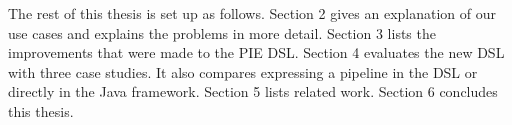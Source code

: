The rest of this thesis is set up as follows.
Section 2 gives an explanation of our use cases and explains the problems in more detail.
Section 3 lists the improvements that were made to the PIE DSL.
Section 4 evaluates the new DSL with three case studies.
It also compares expressing a pipeline in the DSL or directly in the Java framework.
Section 5 lists related work. 
Section 6 concludes this thesis.
